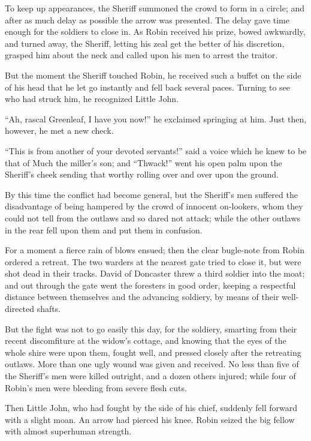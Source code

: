 To keep up appearances, the Sheriff summoned the crowd to form in a
circle; and after as much delay as possible the arrow was presented. The
delay gave time enough for the soldiers to close in. As Robin received
his prize, bowed awkwardly, and turned away, the Sheriff, letting his
zeal get the better of his discretion, grasped him about the neck and
called upon his men to arrest the traitor.

But the moment the Sheriff touched Robin, he received such a buffet on
the side of his head that he let go instantly and fell back several
paces. Turning to see who had struck him, he recognized Little John.

``Ah, rascal Greenleaf, I have you now!'' he exclaimed springing at him.
Just then, however, he met a new check.

``This is from another of your devoted servants!'' said a voice which he
knew to be that of Much the miller's son; and ``Thwack!'' went his open
palm upon the Sheriff's cheek sending that worthy rolling over and over
upon the ground.

By this time the conflict had become general, but the Sheriff's men
suffered the disadvantage of being hampered by the crowd of innocent
on-lookers, whom they could not tell from the outlaws and so dared not
attack; while the other outlaws in the rear fell upon them and put them
in confusion.

For a moment a fierce rain of blows ensued; then the clear bugle-note
from Robin ordered a retreat. The two warders at the nearest gate tried
to close it, but were shot dead in their tracks. David of Doncaster
threw a third soldier into the moat; and out through the gate went the
foresters in good order, keeping a respectful distance between
themselves and the advancing soldiery, by means of their well-directed
shafts.

But the fight was not to go easily this day, for the soldiery, smarting
from their recent discomfiture at the widow's cottage, and knowing that
the eyes of the whole shire were upon them, fought well, and pressed
closely after the retreating outlaws. More than one ugly wound was given
and received. No less than five of the Sheriff's men were killed
outright, and a dozen others injured; while four of Robin's men were
bleeding from severe flesh cuts.

Then Little John, who had fought by the side of his chief, suddenly fell
forward with a slight moan. An arrow had pierced his knee. Robin seized
the big fellow with almost superhuman strength.

